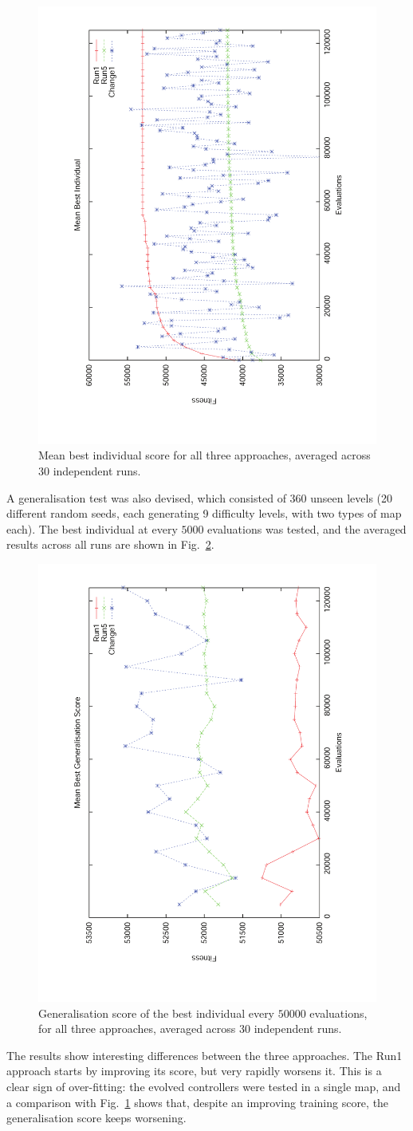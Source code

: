 \documentclass[conference]{IEEEtran}
\begin{document}
\begin{figure}[ht]
	\begin{center}
	\includegraphics[width = .33\textwidth, angle=270]{images/mbi}
	\caption{Mean best individual score for all three approaches, averaged
	across 30 independent runs.}
	\label{fig:training}
	\end{center}
\end{figure}

A generalisation test was also devised, which consisted of 360 unseen levels
(20 different random seeds, each generating 9 difficulty levels, with two types
of map each). The best individual at every $5000$ evaluations was tested, and
the averaged results across all runs are shown in Fig.~\ref{fig:generalisation}.

\begin{figure}[ht]
	\begin{center}
	\includegraphics[width = .33\textwidth, angle=270]{images/mbg}
	\caption{Generalisation score of the best individual every $50000$
	evaluations,  for all three approaches, averaged across 30 independent
	runs.}
	\label{fig:generalisation}
	\end{center}
\end{figure}

The results show interesting differences between the three approaches. The Run1
approach starts by improving its score, but very rapidly worsens it.
This is a clear sign of over-fitting: the evolved controllers were tested in a
single map, and a comparison with Fig.~\ref{fig:training} shows that,
despite an improving training score, the generalisation score keeps worsening.
\end{document}
